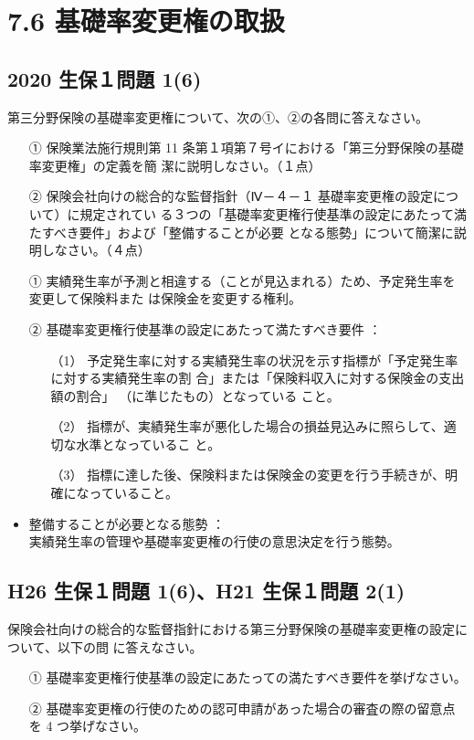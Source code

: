 \documentclass[report,gutter=10mm,fore-edge=10mm,uplatex,dvipdfmx]{jlreq}
\begin{document}
\section{7.6 基礎率変更権の取扱}
\subsection{2020 生保１問題 1(6)}
第三分野保険の基礎率変更権について、次の①、②の各問に答えなさい。
\begin{enumerate}
 \item [①]  保険業法施行規則第 11 条第１項第７号イにおける「第三分野保険の基礎率変更権」の定義を簡
 潔に説明しなさい。（１点）
 \item [②] 保険会社向けの総合的な監督指針（Ⅳ－４－１ 基礎率変更権の設定について）に規定されてい
 る３つの「基礎率変更権行使基準の設定にあたって満たすべき要件」および「整備することが必要
 となる態勢」について簡潔に説明しなさい。（４点）
\end{enumerate}
\begin{itemize}
 \item [①] 実績発生率が予測と相違する（ことが見込まれる）ため、予定発生率を変更して保険料また
 は保険金を変更する権利。
 \item [②] 基礎率変更権行使基準の設定にあたって満たすべき要件 ：
\begin{enumerate}
 \item [（1）] 予定発生率に対する実績発生率の状況を示す指標が「予定発生率に対する実績発生率の割
 合」または「保険料収入に対する保険金の支出額の割合」
 （に準じたもの）となっている
 こと。
 \item  [（2）]指標が、実績発生率が悪化した場合の損益見込みに照らして、適切な水準となっているこ
 と。
 \item  [（3）]指標に達した後、保険料または保険金の変更を行う手続きが、明確になっていること。
\end{enumerate} 
 \item 整備することが必要となる態勢 ：\\
 実績発生率の管理や基礎率変更権の行使の意思決定を行う態勢。
\end{itemize}
\subsection{H26 生保１問題 1(6)、H21 生保１問題 2(1)}

保険会社向けの総合的な監督指針における第三分野保険の基礎率変更権の設定について、以下の問
に答えなさい。
\begin{itemize}
 \item [①]基礎率変更権行使基準の設定にあたっての満たすべき要件を挙げなさい。
 \item [②]基礎率変更権の行使のための認可申請があった場合の審査の際の留意点を 4 つ挙げなさい。
\end{itemize}
\end{document}
